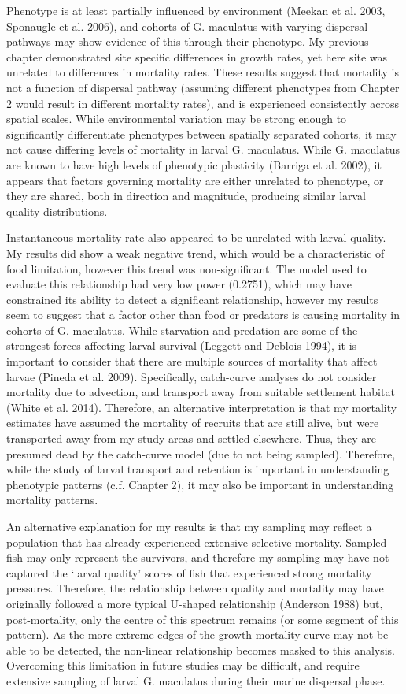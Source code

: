 \documentclass[]{book}
\begin{document}
Phenotype is at least partially influenced by environment (Meekan et al.
2003, Sponaugle et al. 2006), and cohorts of G. maculatus with varying
dispersal pathways may show evidence of this through their phenotype. My
previous chapter demonstrated site specific differences in growth rates,
yet here site was unrelated to differences in mortality rates. These
results suggest that mortality is not a function of dispersal pathway
(assuming different phenotypes from Chapter 2 would result in different
mortality rates), and is experienced consistently across spatial scales.
While environmental variation may be strong enough to significantly
differentiate phenotypes between spatially separated cohorts, it may not
cause differing levels of mortality in larval G. maculatus. While G.
maculatus are known to have high levels of phenotypic plasticity
(Barriga et al. 2002), it appears that factors governing mortality are
either unrelated to phenotype, or they are shared, both in direction and
magnitude, producing similar larval quality distributions.

Instantaneous mortality rate also appeared to be unrelated with larval
quality. My results did show a weak negative trend, which would be a
characteristic of food limitation, however this trend was
non-significant. The model used to evaluate this relationship had very
low power (0.2751), which may have constrained its ability to detect a
significant relationship, however my results seem to suggest that a
factor other than food or predators is causing mortality in cohorts of
G. maculatus. While starvation and predation are some of the strongest
forces affecting larval survival (Leggett and Deblois 1994), it is
important to consider that there are multiple sources of mortality that
affect larvae (Pineda et al. 2009). Specifically, catch-curve analyses
do not consider mortality due to advection, and transport away from
suitable settlement habitat (White et al. 2014). Therefore, an
alternative interpretation is that my mortality estimates have assumed
the mortality of recruits that are still alive, but were transported
away from my study areas and settled elsewhere. Thus, they are presumed
dead by the catch-curve model (due to not being sampled). Therefore,
while the study of larval transport and retention is important in
understanding phenotypic patterns (c.f. Chapter 2), it may also be
important in understanding mortality patterns.

An alternative explanation for my results is that my sampling may
reflect a population that has already experienced extensive selective
mortality. Sampled fish may only represent the survivors, and therefore
my sampling may have not captured the `larval quality' scores of fish
that experienced strong mortality pressures. Therefore, the relationship
between quality and mortality may have originally followed a more
typical U-shaped relationship (Anderson 1988) but, post-mortality, only
the centre of this spectrum remains (or some segment of this pattern).
As the more extreme edges of the growth-mortality curve may not be able
to be detected, the non-linear relationship becomes masked to this
analysis. Overcoming this limitation in future studies may be difficult,
and require extensive sampling of larval G. maculatus during their
marine dispersal phase.
\end{document}
